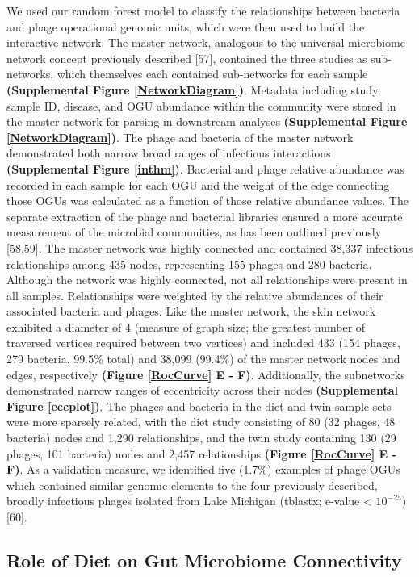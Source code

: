 \documentclass[12pt,]{article}
\begin{document}
We used our random forest model to classify the relationships between
bacteria and phage operational genomic units, which were then used to
build the interactive network. The master network, analogous to the
universal microbiome network concept previously described {[}57{]},
contained the three studies as sub-networks, which themselves each
contained sub-networks for each sample \textbf{(Supplemental Figure
\ref{NetworkDiagram})}. Metadata including study, sample ID, disease,
and OGU abundance within the community were stored in the master network
for parsing in downstream analyses \textbf{(Supplemental Figure
\ref{NetworkDiagram})}. The phage and bacteria of the master network
demonstrated both narrow broad ranges of infectious interactions
\textbf{(Supplemental Figure \ref{inthm})}. Bacterial and phage relative
abundance was recorded in each sample for each OGU and the weight of the
edge connecting those OGUs was calculated as a function of those
relative abundance values. The separate extraction of the phage and
bacterial libraries ensured a more accurate measurement of the microbial
communities, as has been outlined previously {[}58,59{]}. The master
network was highly connected and contained 38,337 infectious
relationships among 435 nodes, representing 155 phages and 280 bacteria.
Although the network was highly connected, not all relationships were
present in all samples. Relationships were weighted by the relative
abundances of their associated bacteria and phages. Like the master
network, the skin network exhibited a diameter of 4 (measure of graph
size; the greatest number of traversed vertices required between two
vertices) and included 433 (154 phages, 279 bacteria, 99.5\% total) and
38,099 (99.4\%) of the master network nodes and edges, respectively
\textbf{(Figure \ref{RocCurve} E - F)}. Additionally, the subnetworks
demonstrated narrow ranges of eccentricity across their nodes
\textbf{(Supplemental Figure \ref{eccplot})}. The phages and bacteria in
the diet and twin sample sets were more sparsely related, with the diet
study consisting of 80 (32 phages, 48 bacteria) nodes and 1,290
relationships, and the twin study containing 130 (29 phages, 101
bacteria) nodes and 2,457 relationships \textbf{(Figure \ref{RocCurve} E
- F)}. As a validation measure, we identified five (1.7\%) examples of
phage OGUs which contained similar genomic elements to the four
previously described, broadly infectious phages isolated from Lake
Michigan (tblastx; e-value \textless{} \(10^{-25}\)) {[}60{]}.

\subsection{Role of Diet on Gut Microbiome
Connectivity}\label{role-of-diet-on-gut-microbiome-connectivity}
\end{document}
